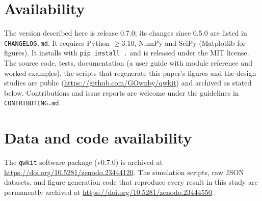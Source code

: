 \documentclass[11pt]{article}
\newcommand{\code}[1]{\texttt{#1}}
\begin{document}
\section{Availability}
The version described here is release 0.7.0; its changes since 0.5.0 are listed in \code{CHANGELOG.md}. It requires Python $\geq$3.10, NumPy and SciPy (Matplotlib for figures). It installs with \mbox{\code{pip install .}} and is released under the MIT license. The source code, tests, documentation (a user guide with module reference and worked examples), the scripts that regenerate this paper's figures and the design studies are public (\url{https://github.com/GOwnby/qwkit}) and archived as stated below. Contributions and issue reports are welcome under the guidelines in \code{CONTRIBUTING.md}.

\section*{Data and code availability}
The \texttt{qwkit} software package (v0.7.0) is archived at \url{https://doi.org/10.5281/zenodo.23444120}. The simulation scripts, raw JSON datasets, and figure-generation code that reproduce every result in this study are permanently archived at \url{https://doi.org/10.5281/zenodo.23444550}.



\end{document}
